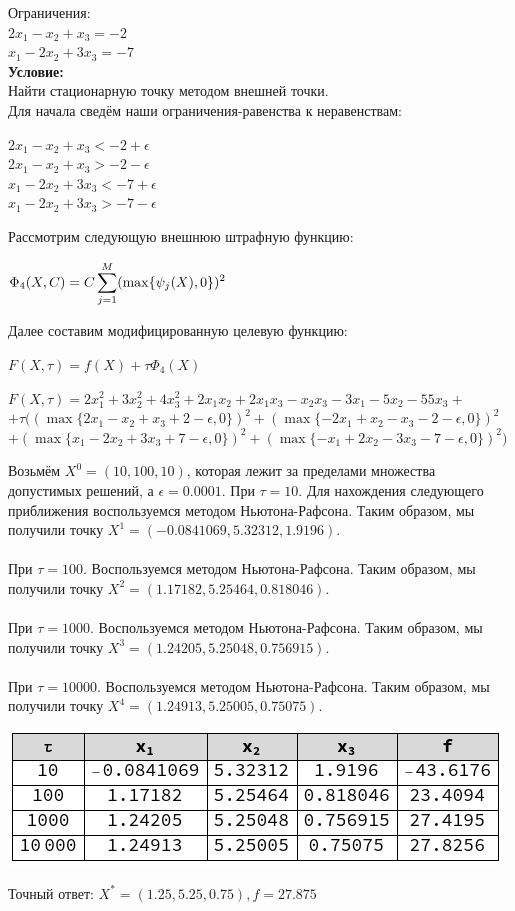 \documentclass[14pt,a4paper,fleqn]{extarticle}
\begin{document}
	Ограничения:\\
	$2x_1 - x_2 + x_3 = -2$\\
	$x_1 - 2x_2 + 3x_3 = -7$\\
	
	\textbf{Условие:}\\
	Найти стационарную точку методом внешней точки.\\
	
	Для начала сведём наши ограничения-равенства к неравенствам:
	\begin{center}
		$2x_1 - x_2 + x_3 < -2 + \epsilon$\\
		$2x_1 - x_2 + x_3 > -2 - \epsilon$\\
		$x_1 - 2x_2 + 3x_3 < -7 + \epsilon$\\
		$x_1 - 2x_2 + 3x_3 > -7 - \epsilon$\\
	\end{center}

	Рассмотрим следующую внешнюю штрафную функцию:
	\begin{center}
		$\Phi_4(X,C)= C\smashoperator[r]{\sum_{j=1}^{M}} (\max\{\psi_j(X), 0\})^2$
	\end{center}
	Далее составим модифицированную целевую функцию:
	\begin{center}
		$F(X, \tau) = f(X) + \tau \Phi_4(X)$
	\end{center}
	\begin{center}
		\small $F(X, \tau) = 2x_1^2 + 3x_2^2 + 4x_3^2 + 2x_1x_2 + 2x_1x_3 - x_2x_3 - 3x_1 - 5x_2 - 55x_3 +$\\
		$ + \tau ((\max \{2x_1-x_2+x_3+2-\epsilon, 0\})^2 + (\max \{-2x_1+x_2-x_3-2-\epsilon, 0\})^2$
		$ + (\max \{x_1-2x_2+3x_3+7-\epsilon, 0\})^2 + (\max \{-x_1+2x_2-3x_3-7-\epsilon, 0\})^2)$
	\end{center}
	Возьмём $X^0 = (10, 100, 10)$, которая лежит за пределами множества допустимых решений, а $\epsilon = 0.0001$.
	\newpage
	При $\tau = 10$. Для нахождения следующего приближения воспользуемся методом Ньютона-Рафсона. Таким образом, мы получили точку $X^1 = (-0.0841069, 5.32312, 1.9196)$.\\\\
	При $\tau = 100$. Воспользуемся методом Ньютона-Рафсона. Таким образом, мы получили точку $X^2 = (1.17182, 5.25464, 0.818046)$.\\\\
	При $\tau = 1000$. Воспользуемся методом Ньютона-Рафсона. Таким образом, мы получили точку $X^3 = (1.24205, 5.25048, 0.756915)$.\\\\
	При $\tau = 10000$. Воспользуемся методом Ньютона-Рафсона. Таким образом, мы получили точку $X^4 = (1.24913, 5.25005, 0.75075)$.
	\begin{center}
		\includegraphics[scale=0.55]{pic}
	\end{center}
	
	Точный ответ: $X^* = (1.25, 5.25, 0.75), f = 27.875$
\end{document}
